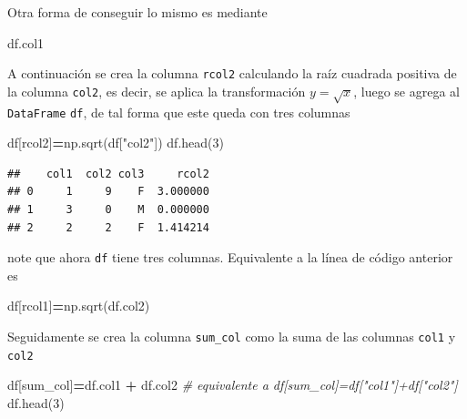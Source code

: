 \documentclass[
]{book}
\newenvironment{Shaded}{\begin{snugshade}}{\end{snugshade}}
\newcommand{\CommentTok}[1]{\textcolor[rgb]{0.56,0.35,0.01}{\textit{#1}}}
\newcommand{\DecValTok}[1]{\textcolor[rgb]{0.00,0.00,0.81}{#1}}
\newcommand{\NormalTok}[1]{#1}
\newcommand{\OperatorTok}[1]{\textcolor[rgb]{0.81,0.36,0.00}{\textbf{#1}}}
\newcommand{\StringTok}[1]{\textcolor[rgb]{0.31,0.60,0.02}{#1}}
\theoremstyle{definition}
\theoremstyle{definition}
\theoremstyle{definition}
\theoremstyle{definition}
\theoremstyle{remark}
\begin{document}
Otra forma de conseguir lo mismo es mediante

\begin{Shaded}
\begin{Highlighting}[]
\NormalTok{df.col1 }
\end{Highlighting}
\end{Shaded}

A continuación se crea la columna \texttt{rcol2} calculando la raíz cuadrada positiva de la columna \texttt{col2}, es decir, se aplica la transformación \(y=\sqrt x\), luego se agrega al \texttt{DataFrame} \texttt{df}, de tal forma que este queda con tres columnas

\begin{Shaded}
\begin{Highlighting}[]
\NormalTok{df[}\StringTok{\textquotesingle{}rcol2\textquotesingle{}}\NormalTok{]}\OperatorTok{=}\NormalTok{np.sqrt(df[}\StringTok{"col2"}\NormalTok{])}
\NormalTok{df.head(}\DecValTok{3}\NormalTok{)}
\end{Highlighting}
\end{Shaded}

\begin{verbatim}
##    col1  col2 col3     rcol2
## 0     1     9    F  3.000000
## 1     3     0    M  0.000000
## 2     2     2    F  1.414214
\end{verbatim}

note que ahora \texttt{df} tiene tres columnas. Equivalente a la línea de código anterior es

\begin{Shaded}
\begin{Highlighting}[]
\NormalTok{df[}\StringTok{\textquotesingle{}rcol1\textquotesingle{}}\NormalTok{]}\OperatorTok{=}\NormalTok{np.sqrt(df.col2)  }
\end{Highlighting}
\end{Shaded}

Seguidamente se crea la columna \texttt{sum\_col} como la suma de las columnas \texttt{col1} y \texttt{col2}

\begin{Shaded}
\begin{Highlighting}[]
\NormalTok{df[}\StringTok{\textquotesingle{}sum\_col\textquotesingle{}}\NormalTok{]}\OperatorTok{=}\NormalTok{df.col1 }\OperatorTok{+}\NormalTok{ df.col2 }
\CommentTok{\# equivalente a df[\textquotesingle{}sum\_col\textquotesingle{}]=df["col1"]+df["col2"]}
\NormalTok{df.head(}\DecValTok{3}\NormalTok{) }
\end{Highlighting}
\end{Shaded}
\end{document}

